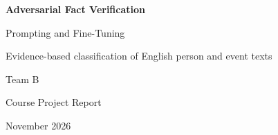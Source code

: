 \documentclass[aspectratio=169,10pt]{beamer}
\begin{document}
\begin{frame}[plain]
\vspace{1.25cm}
\begin{center}
{\color{Blue}\fontsize{26}{30}\selectfont\bfseries Adversarial Fact Verification\par}
\vspace{.30cm}
{\color{MidBlue}\fontsize{14}{18}\selectfont Prompting and Fine-Tuning\par}
\vspace{.13cm}
{\color{MidBlue}\fontsize{11}{14}\selectfont Evidence-based classification of English person and event texts\par}
\vspace{.85cm}
{\fontsize{13}{16}\selectfont Team B\par}
\vspace{.18cm}
Course Project Report\par
\vspace{.12cm}
{\small November 2026}
\end{center}
\end{frame}
\end{document}
